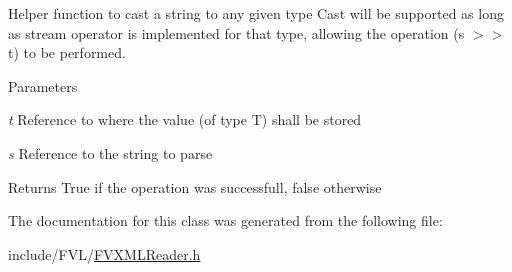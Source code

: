 Helper function to cast a string to any given type Cast will be supported as long as stream operator is implemented for that type, allowing the operation (s $>$$>$ t) to be performed. 


\begin{DoxyParams}{Parameters}
\item[{\em t}]Reference to where the value (of type T) shall be stored \item[{\em s}]Reference to the string to parse \end{DoxyParams}
\begin{DoxyReturn}{Returns}
True if the operation was successfull, false otherwise 
\end{DoxyReturn}


The documentation for this class was generated from the following file:\begin{DoxyCompactItemize}
\item 
include/FVL/\hyperlink{FVXMLReader_8h}{FVXMLReader.h}\end{DoxyCompactItemize}
